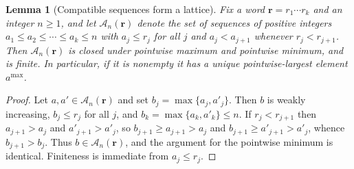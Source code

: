 \documentclass{amsart}
\newtheorem{lemma}{Lemma}[subsection]
\theoremstyle{definition}
\theoremstyle{remark}
\numberwithin{equation}{subsection}
\begin{document}
\begin{lemma}[Compatible sequences form a lattice]\label{lemma:compatlattice}
Fix a word $\mathbf{r}=r_1\cdots r_k$ and an integer $n\geq 1$, and let $\mathcal{A}_n(\mathbf{r})$ denote the set of sequences of positive integers $a_1\leq a_2\leq\cdots\leq a_k\leq n$ with $a_j\leq r_j$ for all $j$ and $a_j<a_{j+1}$ whenever $r_j<r_{j+1}$. Then $\mathcal{A}_n(\mathbf{r})$ is closed under pointwise maximum and pointwise minimum, and is finite. In particular, if it is nonempty it has a unique pointwise-largest element $a^{\max}$.
\end{lemma}
\begin{proof}
Let $a,a'\in\mathcal{A}_n(\mathbf{r})$ and set $b_j=\max\{a_j,a'_j\}$. Then $b$ is weakly increasing, $b_j\leq r_j$ for all $j$, and $b_k=\max\{a_k,a'_k\}\leq n$. If $r_j<r_{j+1}$ then $a_{j+1}>a_j$ and $a'_{j+1}>a'_j$, so $b_{j+1}\geq a_{j+1}>a_j$ and $b_{j+1}\geq a'_{j+1}>a'_j$, whence $b_{j+1}>b_j$. Thus $b\in\mathcal{A}_n(\mathbf{r})$, and the argument for the pointwise minimum is identical. Finiteness is immediate from $a_j\leq r_j$.
\end{proof}
\end{document}
